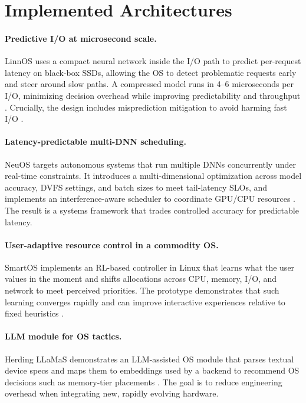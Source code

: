 \documentclass{article}
\begin{document}
\section{Implemented Architectures}
\paragraph{Predictive I/O at microsecond scale.}
LinnOS uses a compact neural network inside the I/O path to predict per-request latency on black-box SSDs, allowing the OS to detect problematic requests early and steer around slow paths. A compressed model runs in 4--6 microseconds per I/O, minimizing decision overhead while improving predictability and throughput \cite{hao2020linnos}. %
Crucially, the design includes misprediction mitigation to avoid harming fast I/O \cite{hao2020linnos}. %

\paragraph{Latency-predictable multi-DNN scheduling.}
NeuOS targets autonomous systems that run multiple DNNs concurrently under real-time constraints. It introduces a multi-dimensional optimization across model accuracy, DVFS settings, and batch sizes to meet tail-latency SLOs, and implements an interference-aware scheduler to coordinate GPU/CPU resources \cite{bateni2020neuos}. %
The result is a systems framework that trades controlled accuracy for predictable latency.

\paragraph{User-adaptive resource control in a commodity OS.}
SmartOS implements an RL-based controller in Linux that learns what the user values in the moment and shifts allocations across CPU, memory, I/O, and network to meet perceived priorities. The prototype demonstrates that such learning converges rapidly and can improve interactive experiences relative to fixed heuristics \cite{goodarzy2021smartos}. %

\paragraph{LLM module for OS tactics.}
Herding LLaMaS demonstrates an LLM-assisted OS module that parses textual device specs and maps them to embeddings used by a backend to recommend OS decisions such as memory-tier placements \cite{kamath2024llamas}. %
The goal is to reduce engineering overhead when integrating new, rapidly evolving hardware.
\end{document}
